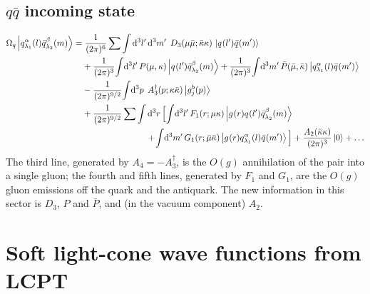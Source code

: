 \documentclass[11pt]{article}
\newcommand{\dd}{\mathrm{d}}
\newcommand{\dt}[1]{\dd^3 #1\,}
\newcommand{\dg}{\dagger}
\newcommand{\ket}[1]{\left|#1\right\rangle}
\newcommand{\vac}{\ket{0}}
\newcommand{\gl}[3]{g^{#1}_{#2}(#3)}
\newcommand{\qk}[3]{q^{#1}_{#2}(#3)}
\newcommand{\aqk}[3]{\bar q^{#1}_{#2}(#3)}
\newcommand{\OM}{\Omega}
\newcommand{\OMq}{\OM_{q}}
\begin{document}
\subsection{$q\bar q$ incoming state}
\begin{align}
\OMq\ket{\qk{\alpha}{\lambda_1}{l}\aqk{\beta}{\lambda_2}{m}}
=&\;\frac{1}{(2\pi)^{6}}\sum\int\dt{l'}\dt{m'}\;D_3(\mu\bar\mu;\bar\kappa\kappa)\,
\ket{\qk{}{}{l'}\aqk{}{}{m'}}
\nonumber\\
&+\frac{1}{(2\pi)^3}\!\int\!\dt{l'}P(\mu,\kappa)\ket{\qk{}{}{l'}\aqk{\beta}{\lambda_2}{m}}
+\frac{1}{(2\pi)^3}\!\int\!\dt{m'}\bar P(\bar\mu,\bar\kappa)\ket{\qk{\alpha}{\lambda_1}{l}\aqk{}{}{m'}}
\nonumber\\
&-\frac{1}{(2\pi)^{9/2}}\!\int\!\dt{p}\;A^\dg_3(p;\kappa\bar\kappa)\ket{\gl{b}{j}{p}}
\nonumber\\
&+\frac{1}{(2\pi)^{9/2}}\sum\int\dt{r}\Big[\!\int\!\dt{l'}F_1(r;\mu\kappa)\ket{\gl{}{}{r}\qk{}{}{l'}\aqk{\beta}{\lambda_2}{m}}
\nonumber\\&\hspace{2.6cm}
+\!\int\!\dt{m'}G_1(r;\bar\mu\bar\kappa)\ket{\gl{}{}{r}\qk{\alpha}{\lambda_1}{l}\aqk{}{}{m'}}\Big]
+\frac{A_2(\bar\kappa\kappa)}{(2\pi)^{3}}\vac+\dots
\label{eq:Omqq}
\end{align}
The third line, generated by $A_4=-A^\dg_3$, is the $O(g)$ annihilation of the pair into a single
gluon; the fourth and fifth lines, generated by $F_1$ and $G_1$, are the $O(g)$ gluon emissions off
the quark and the antiquark. The new information in this sector is $D_3$, $P$ and $\bar P$, and (in
the vacuum component) $A_2$.

\section{Soft light-cone wave functions from LCPT}
\label{sec:wf}
\end{document}
